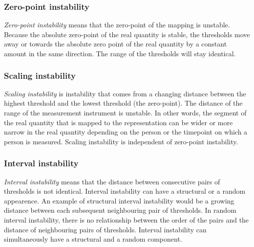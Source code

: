 \documentclass[utf8]{FrontiersinVancouver}
\begin{document}
\subsubsection{Zero-point instability}
\textit{Zero-point instability} means that the zero-point of the mapping is unstable. Because the absolute zero-point of the real quantity is stable, the thresholds move away or towards the absolute zero point of the real quantity by a constant amount in the same direction. The range of the thresholds will stay identical. 



\subsubsection{Scaling instability}
\textit{Scaling instability} is instability that comes from a changing distance between the highest threshold and the lowest threshold (the zero-point). The distance of the range of the measurement instrument is unstable. In other words, the segment of the real quantity that is mapped to the representation can be wider or more narrow in the real quantity depending on the person or the timepoint on which a person is measured. Scaling instability is independent of zero-point instability.



\subsubsection{Interval instability}
\textit{Interval instability} means that the distance between consecutive pairs of thresholds is not identical. Interval instability can have a structural or a random appearence. An example of structural interval instability would be a growing distance between each subsequent neighbouring pair of thresholds. In random interval instability, there is no relationship between the order of the pairs and the distance of neighbouring pairs of thresholds. Interval instability can simultaneously have a structural and a random component.
\end{document}
